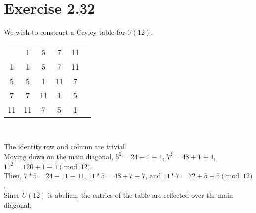 \documentclass{article}
\begin{document}
\section*{Exercise 2.32}
We wish to construct a Cayley table for \(U(12)\).
\begin{center}
    \begin{tabular}{c | c c c c c }
           & 1  & 5  & 7  & 11 \\
        \cline{1-5}
        1  & 1  & 5  & 7  & 11 \\
        5  & 5  & 1  & 11 & 7  \\
        7  & 7  & 11 & 1  & 5  \\
        11 & 11 & 7  & 5 & 1  \\
    \end{tabular}\\
\end{center}
The identity row and column are trivial. \\
Moving down on the main diagonal, \(5^2=24 + 1\equiv 1\), \(7^2=48+1\equiv 1\), \(11^2=120 + 1\equiv 1 \pmod{12}\). \\
Then, \(7*5=24+11\equiv 11\), \(11*5=48+7\equiv 7\), and \(11*7=72+5\equiv 5\pmod{12}\). \\
Since \(U(12)\) is abelian, the entries of the table are reflected over the main diagonal.
\end{document}
